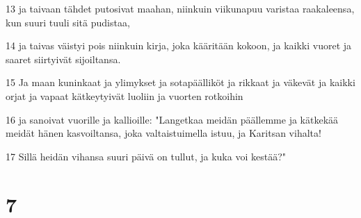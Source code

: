 \par 13 ja taivaan tähdet putosivat maahan, niinkuin viikunapuu varistaa raakaleensa, kun suuri tuuli sitä pudistaa,
\par 14 ja taivas väistyi pois niinkuin kirja, joka kääritään kokoon, ja kaikki vuoret ja saaret siirtyivät sijoiltansa.
\par 15 Ja maan kuninkaat ja ylimykset ja sotapäälliköt ja rikkaat ja väkevät ja kaikki orjat ja vapaat kätkeytyivät luoliin ja vuorten rotkoihin
\par 16 ja sanoivat vuorille ja kallioille: "Langetkaa meidän päällemme ja kätkekää meidät hänen kasvoiltansa, joka valtaistuimella istuu, ja Karitsan vihalta!
\par 17 Sillä heidän vihansa suuri päivä on tullut, ja kuka voi kestää?"

\chapter{7}

